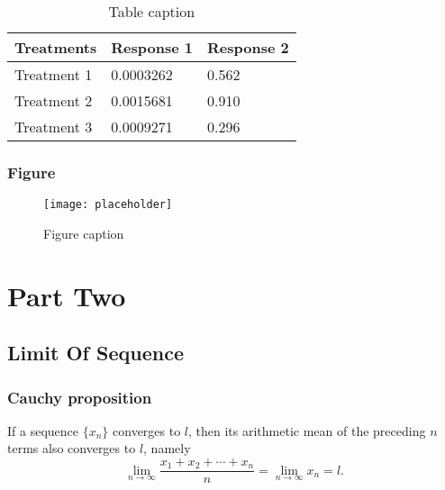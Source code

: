 \documentclass[11pt,fleqn]{book} %
\begin{document}
\begin{table}[h]
\centering
\begin{tabular}{l l l}
\toprule
\textbf{Treatments} & \textbf{Response 1} & \textbf{Response 2}\\
\midrule
Treatment 1 & 0.0003262 & 0.562 \\
Treatment 2 & 0.0015681 & 0.910 \\
Treatment 3 & 0.0009271 & 0.296 \\
\bottomrule
\end{tabular}
\caption{Table caption}
\end{table}


\section{Figure}

\begin{figure}[h]
\centering\texttt{[image: placeholder]}
\caption{Figure caption}
\end{figure}





\part{Part Two}


\chapter{Limit Of Sequence}

\section{Cauchy proposition}

\begin{theorem}
    If a sequence $\{x_n\}$ converges to $l$, then its arithmetic mean of the preceding $n$ terms also converges to $l$, namely
    \begin{equation}
    \lim\limits_{n\to\infty}\frac{x_1+x_2+\cdots+x_n}{n}=\lim\limits_{n\to\infty}x_n=l.
    \end{equation}
\end{theorem}
\end{document}

